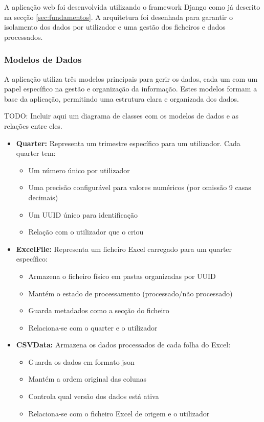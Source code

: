 A aplicação web foi desenvolvida utilizando o framework Django como já descrito na secção \ref{sec:fundamentos}. A arquitetura foi desenhada para garantir o isolamento dos dados por utilizador e uma gestão dos ficheiros e dados processados.

\subsubsection{Modelos de Dados}

A aplicação utiliza três modelos principais para gerir os dados, cada um com um papel específico na gestão e organização da informação. Estes modelos formam a base da aplicação, permitindo uma estrutura clara e organizada dos dados.

TODO: Incluir aqui um diagrama de classes com os modelos de dados e as relações entre eles.

\begin{itemize}
    \item \textbf{Quarter:} Representa um trimestre específico para um utilizador. Cada quarter tem:
    \begin{itemize}
        \item Um número único por utilizador
        \item Uma precisão configurável para valores numéricos (por omissão 9 casas decimais)
        \item Um UUID único para identificação
        \item Relação com o utilizador que o criou
    \end{itemize}

    \item \textbf{ExcelFile:} Representa um ficheiro Excel carregado para um quarter específico:
    \begin{itemize}
        \item Armazena o ficheiro físico em pastas organizadas por UUID
        \item Mantém o estado de processamento (processado/não processado)
        \item Guarda metadados como a secção do ficheiro
        \item Relaciona-se com o quarter e o utilizador
    \end{itemize}

    \item \textbf{CSVData:} Armazena os dados processados de cada folha do Excel:
    \begin{itemize}
        \item Guarda os dados em formato \gls{json}
        \item Mantém a ordem original das colunas
        \item Controla qual versão dos dados está ativa
        \item Relaciona-se com o ficheiro Excel de origem e o utilizador
    \end{itemize}
\end{itemize}

